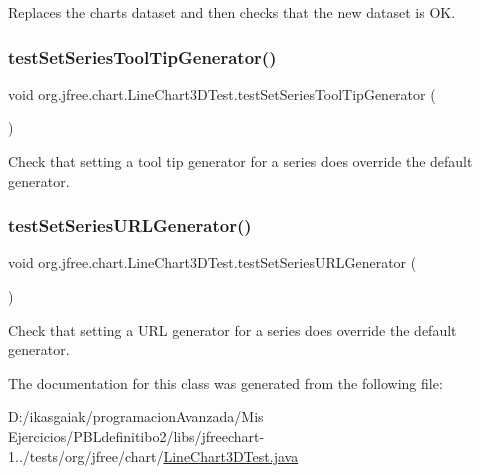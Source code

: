 Replaces the chart\textquotesingle{}s dataset and then checks that the new dataset is OK. \mbox{\label{classorg_1_1jfree_1_1chart_1_1_line_chart3_d_test_a56fdd84524eb32c7f86493e331c63ec9}} 
\subsubsection{\texorpdfstring{test\+Set\+Series\+Tool\+Tip\+Generator()}{testSetSeriesToolTipGenerator()}}
{\footnotesize\ttfamily void org.\+jfree.\+chart.\+Line\+Chart3\+D\+Test.\+test\+Set\+Series\+Tool\+Tip\+Generator (\begin{DoxyParamCaption}{ }\end{DoxyParamCaption})}

Check that setting a tool tip generator for a series does override the default generator. \mbox{\label{classorg_1_1jfree_1_1chart_1_1_line_chart3_d_test_aaa97c6f7c8cd3020cec1f16f631c15d3}} 
\subsubsection{\texorpdfstring{test\+Set\+Series\+U\+R\+L\+Generator()}{testSetSeriesURLGenerator()}}
{\footnotesize\ttfamily void org.\+jfree.\+chart.\+Line\+Chart3\+D\+Test.\+test\+Set\+Series\+U\+R\+L\+Generator (\begin{DoxyParamCaption}{ }\end{DoxyParamCaption})}

Check that setting a U\+RL generator for a series does override the default generator. 

The documentation for this class was generated from the following file\+:\begin{DoxyCompactItemize}
\item 
D\+:/ikasgaiak/programacion\+Avanzada/\+Mis Ejercicios/\+P\+B\+Ldefinitibo2/libs/jfreechart-\/1../tests/org/jfree/chart/\mbox{\hyperlink{_line_chart3_d_test_8java}{Line\+Chart3\+D\+Test.\+java}}\end{DoxyCompactItemize}
